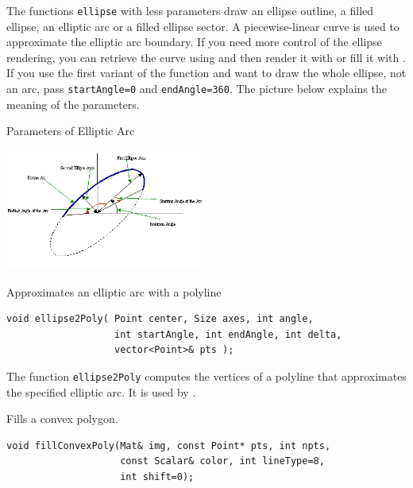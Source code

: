 The functions \texttt{ellipse} with less parameters draw an ellipse outline, a filled ellipse, an elliptic
arc or a filled ellipse sector. 
A piecewise-linear curve is used to approximate the elliptic arc boundary. If you need more control of the ellipse rendering, you can retrieve the curve using  and then render it with  or fill it with . If you use the first variant of the function and want to draw the whole ellipse, not an arc, pass \texttt{startAngle=0} and \texttt{endAngle=360}. The picture below
explains the meaning of the parameters.

Parameters of Elliptic Arc

\includegraphics[width=0.5\textwidth]{pics/ellipse.png}

\label{ellipse2Poly}
Approximates an elliptic arc with a polyline

\begin{lstlisting}
void ellipse2Poly( Point center, Size axes, int angle,
                   int startAngle, int endAngle, int delta,
                   vector<Point>& pts );
\end{lstlisting}
\begin{description}
\end{description}

The function \texttt{ellipse2Poly} computes the vertices of a polyline that approximates the specified elliptic arc. It is used by .

\label{fillConvexPoly}
Fills a convex polygon.

\begin{lstlisting}
void fillConvexPoly(Mat& img, const Point* pts, int npts,
                    const Scalar& color, int lineType=8,
                    int shift=0);
\end{lstlisting}
\begin{description}
\end{description}


